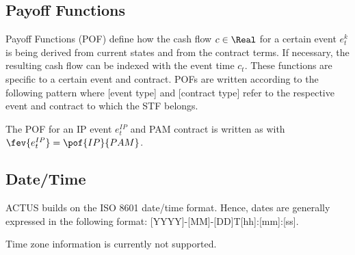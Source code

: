 \subsection{Payoff Functions}\label{sec:pof}

Payoff Functions (POF) define how the cash flow $c\in\Real$ for a certain event $e_t^k$ is being derived from current states and from the contract terms. If necessary, the resulting cash flow can be indexed with the event time $c_t$. These functions are specific to a certain event and contract. POFs are written according to the following pattern  where [event type] and [contract type] refer to the respective event and contract to which the STF belongs.

\begin{example}
The POF for an IP event $e_t^{IP}$ and PAM contract is written as  with $\fev{e_t^{IP}}=\pof{IP}{PAM}$.
\end{example}


\subsection{Date/Time}\label{sec:time}

ACTUS builds on the ISO 8601 date/time format. Hence, dates are generally expressed in the following format: [YYYY]-[MM]-[DD]T[hh]:[mm]:[ss].

Time zone information is currently not supported.

